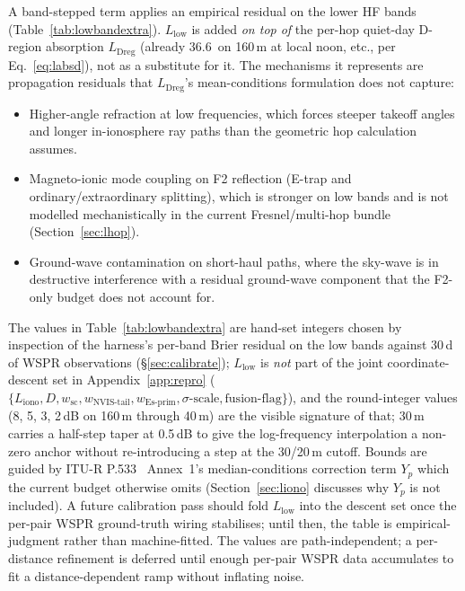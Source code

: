 \documentclass[11pt,a4paper]{article}
\newcommand{\SI}[2]{#1\,\text{#2}}
\newcommand{\dB}{\text{dB}}
\begin{document}
A band-stepped term applies an empirical residual on the lower HF
bands (Table~\ref{tab:lowbandextra}). $L_{\text{low}}$ is added
\emph{on top of} the per-hop quiet-day D-region absorption
$L_{\text{Dreg}}$ (already \SI{36.6}{\dB} on 160\,m at local noon,
etc., per Eq.~\ref{eq:labsd}), not as a substitute for it. The
mechanisms it represents are propagation residuals that
$L_{\text{Dreg}}$'s mean-conditions formulation does not capture:
\begin{itemize}[nosep]
  \item Higher-angle refraction at low frequencies, which forces
        steeper takeoff angles and longer in-ionosphere ray paths
        than the geometric hop calculation assumes.
  \item Magneto-ionic mode coupling on F2 reflection (E-trap and
        ordinary/extraordinary splitting), which is stronger on
        low bands and is not modelled mechanistically in the
        current Fresnel/multi-hop bundle (Section~\ref{sec:lhop}).
  \item Ground-wave contamination on short-haul paths, where the
        sky-wave is in destructive interference with a residual
        ground-wave component that the F2-only budget does not
        account for.
\end{itemize}
The values in Table~\ref{tab:lowbandextra} are hand-set integers
chosen by inspection of the harness's per-band Brier residual on
the low bands against 30\,d of WSPR
observations (\S\ref{sec:calibrate}); $L_{\text{low}}$ is
\emph{not} part of the joint coordinate-descent set in
Appendix~\ref{app:repro} ($\{L_{\text{iono}}, D, w_{\text{sc}},
w_{\text{NVIS-tail}}, w_{\text{Es-prim}}, \sigma\text{-scale},
\text{fusion-flag}\}$), and the round-integer values (8, 5, 3,
2\,dB on 160\,m through 40\,m) are the visible signature of
that; 30\,m carries a half-step taper at 0.5\,dB to give the
log-frequency interpolation a non-zero anchor without
re-introducing a step at the 30/20\,m cutoff.  Bounds are guided by ITU-R
P.533~\cite{itup533} Annex~1's median-conditions correction term
$Y_p$ which the current budget otherwise omits
(Section~\ref{sec:liono} discusses why $Y_p$ is not included).
A future calibration pass should fold $L_{\text{low}}$ into the
descent set once the per-pair WSPR ground-truth wiring stabilises;
until then, the table is empirical-judgment rather than
machine-fitted.
The values are path-independent; a per-distance refinement is
deferred until enough per-pair WSPR data accumulates to fit a
distance-dependent ramp without inflating noise.
\end{document}
